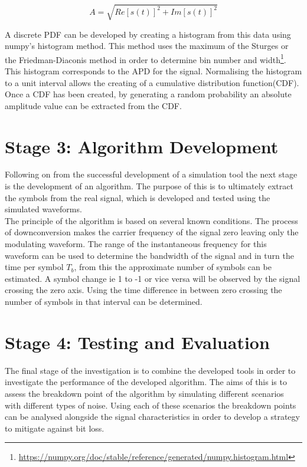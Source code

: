 \begin{equation}
    A = \sqrt{Re[s(t)]^2 + Im[s(t)]^2}
    \label{eq:complexAmp}
\end{equation}

A discrete PDF can be developed by creating a histogram from this data using numpy's histogram method. This method uses the maximum of the Sturges or the Friedman-Diaconis method in order to determine bin number and width\footnote{\hyperlink{https://numpy.org/doc/sTable/reference/generated/numpy.histogram.html}{https://numpy.org/doc/stable/reference/generated/numpy.histogram.html}}.
This histogram corresponds to the APD for the signal. Normalising the histogram to a unit interval allows the creating of a cumulative distribution function(CDF). Once a CDF has been created, by generating a random probability an absolute amplitude value can be extracted from the CDF.


\section{Stage 3: Algorithm Development}
Following on from the successful development of a simulation tool the next stage is the development of an algorithm. The purpose of this is to ultimately extract the symbols from the real signal, which is developed and tested using the simulated waveforms.
\\
The principle of the algorithm is based on several known conditions. The process of downconversion makes the carrier frequency of the signal zero leaving only the modulating waveform. The range of the instantaneous frequency for this waveform can be used to determine the bandwidth of the signal and in turn the time per symbol $T_b$, from this the approximate number of symbols can be estimated. A symbol change ie 1 to -1 or vice versa will be observed by the signal crossing the zero axis. Using the time difference in between zero crossing the number of symbols in that interval can be determined. 

\section{Stage 4: Testing and Evaluation}
The final stage of the investigation is to combine the developed tools in order to investigate the performance of the developed algorithm. The aims of this is to assess the breakdown point of the algorithm by simulating different scenarios with different types of noise. Using each of these scenarios the breakdown points can be analysed alongside the signal characteristics in order to develop a strategy to mitigate against bit loss.
